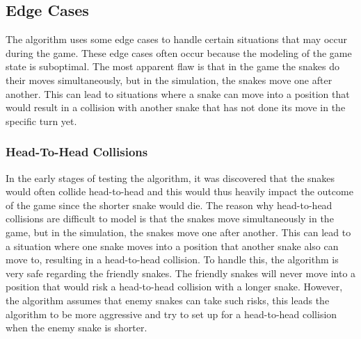 \documentclass[a4paper,12pt]{article}
\begin{document}




\subsection{Edge Cases}

The algorithm uses some edge cases to handle certain situations that may occur during the game. These edge cases often occur because the modeling of the game state is suboptimal. The most apparent flaw is that in the game the snakes do their moves simultaneously, but in the simulation, the snakes move one after another. This can lead to situations where a snake can move into a position that would result in a collision with another snake that has not done its move in the specific turn yet.


\subsubsection{Head-To-Head Collisions} %

In the early stages of testing the algorithm, it was discovered that the snakes would often collide head-to-head and this would thus heavily impact the outcome of the game since the shorter snake would die. %
The reason why head-to-head collisions are difficult to model is that the snakes move simultaneously in the game, but in the simulation, the snakes move one after another. This can lead to a situation where one snake moves into a position that another snake also can move to, resulting in a head-to-head collision. To handle this, the algorithm is very safe regarding the friendly snakes. The friendly snakes will never move into a position that would risk a head-to-head collision with a longer snake. However, the algorithm assumes that enemy snakes can take such risks, this leads the algorithm to be more aggressive and try to set up for a head-to-head collision when the enemy snake is shorter.
\end{document}
